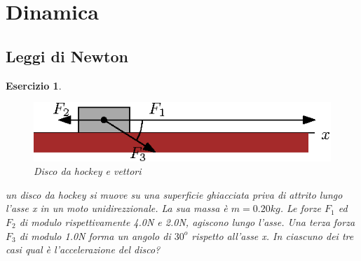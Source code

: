 \documentclass{article}
\newtheorem{es}{Esercizio}[section]
\begin{document}
\section{Dinamica}
\label{sec:din}

\subsection{Leggi di Newton}
\label{sec:leggidiNew}

\begin{es}
  \begin{figure}[ht!]
    \centering
    \includegraphics{img/disco.eps}
    \caption{Disco da hockey e vettori}
    \label{fig:hockeyevett}
  \end{figure}
  un disco da hockey si muove su una superficie ghiacciata priva di attrito lungo l'asse x in un moto unidirezzionale. La sua massa è $m=0.20kg$. Le forze $F_1$ ed $F_2$ di modulo rispettivamente 4.0N e 2.0N, agiscono lungo l'asse. Una terza forza $F_3$ di modulo 1.0N forma un angolo di $30^o$ rispetto all'asse x. In ciascuno dei tre casi qual è l'accelerazione del disco?
\end{es}
\end{document}
